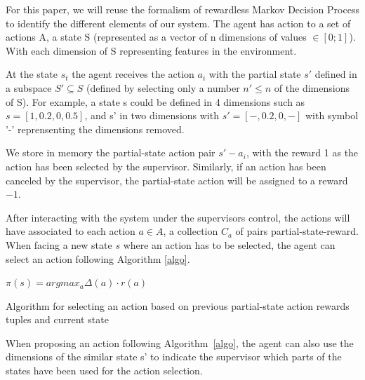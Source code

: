 \documentclass[letterpaper]{article} %
\begin{document}
For this paper, we will reuse the formalism of rewardless Markov Decision 
Process to identify the different elements of our system. The agent has action
to a set of actions A, a state S (represented as a vector of n dimensions of
values $\in [0;1]$). With each dimension of S representing features in the
environment.

At the state $s_{t}$ the agent receives the action $a_{i}$ with the partial
state $s'$ defined in a subspace $S' \subseteq S$ (defined by selecting only a
number $n' \leq n$ of the dimensions of S). For example, a state s could be
defined in 4 dimensions such as $s=[1,0.2,0,0.5]$, and s' in two dimensions with
$s'=[-,0.2,0,-]$ with symbol '-' reprensenting the dimensions removed.

We store in memory the partial-state action pair $s'-a_{i}$, with the reward 1
as the action has been selected by the supervisor. Similarly, if an action has
been canceled by the supervisor, the partial-state action will be assigned to a
reward $-1$.

After interacting with the system under the supervisors control, the actions
will have associated to each action $a \in A$, a collection $C_{a}$ of pairs
partial-state-reward. When facing a new state $s$ where an action has to be
selected, the agent can select an action following Algorithm \ref{algo}.

\begin{algorithm}
    \DontPrintSemicolon
    $\pi(s) = argmax_{a}\Delta(a) \cdot r(a)$

    \caption{Algorithm for selecting an action based on previous
    partial-state action rewards tuples and current state}
    \label{algo}
\end{algorithm}

When proposing an action following Algorithm~\ref{algo}, the agent can also use
the dimensions of the similar state s' to indicate the supervisor which parts of
the states have been used for the action selection.

\end{document}
